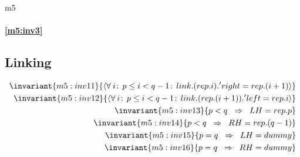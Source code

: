 \documentclass[12pt]{amsart}
\begin{document}
\begin{machine}{m5}
\paragraph{\eqref{m5:inv3}}
\subsection{ Linking } 
  \begin{align}
    \invariant{m5:inv11}
      { \qforall{i}{\betweenR{p}{i}{q-1}}{ link.(rep.i).'right = rep.(i+1) } } \\
    \invariant{m5:inv12}
      { \qforall{i}{\betweenR{p}{i}{q-1}}{ link.(rep.(i+1)).'left = rep.i } } \\
    \invariant{m5:inv13}
      { p < q \2\implies LH = rep.p  } \\
    \invariant{m5:inv14}
      { p < q \2\implies RH = rep.(q-1) } \\
    \invariant{m5:inv15}
      { p = q \2\implies LH = dummy  } \\
    \invariant{m5:inv16}
      { p = q \2\implies RH = dummy }
  \end{align}

\end{machine}
\end{document}
